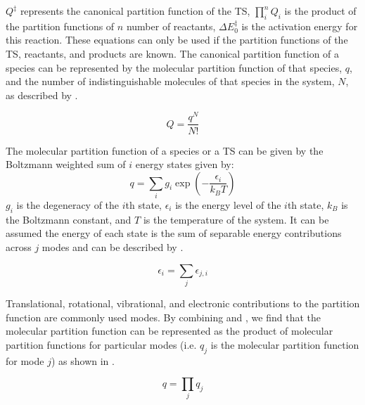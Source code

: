 \documentclass[preprint, 11pt]{elsarticle} %
\begin{document}
$Q^\ddagger$ represents the canonical partition function of the TS, $\prod^n_i Q_i$ is the product of the partition functions of $n$ number of reactants, $\Delta E^{\ddagger}_0$ is the activation energy for this reaction.
These equations can only be used if the partition functions of the TS, reactants, and products are known. 
The canonical partition function of a species can be represented by the molecular partition function of that species, $q$, and the number of indistinguishable molecules of that species in the system, $N$, as described by .

\begin{equation}
    Q = \frac{q^N}{N!}
    \label{eq:q}
\end{equation}


The molecular partition function of a species or a TS can be given by the Boltzmann weighted sum of $i$ energy states given by:
\begin{equation}
    q = \sum_i g_i \exp\left(-\frac{\epsilon_i}{k_B T}\right)
    \label{eq:Q}
\end{equation}
$g_i$ is the degeneracy of the $i$th state, $\epsilon_i$ is the energy level of the $i$th state, $k_B$ is the Boltzmann constant, and $T$ is the temperature of the system.
It can be assumed the energy of each state is the sum of  separable energy contributions across $j$ modes and can be described by .

\begin{equation}
    \epsilon_i = \sum_j \epsilon_{j,i}
    \label{eq:epsilon}
\end{equation}

Translational, rotational, vibrational, and electronic contributions to the partition function are commonly used modes.
By combining  and , we find that the molecular partition function can be represented as the product of molecular partition functions for particular modes (i.e. $q_j$ is the molecular partition function for mode $j$) as shown in . 
 
\begin{equation}
    q = \prod_j q_j
    \label{qtot}
\end{equation}
\end{document}
